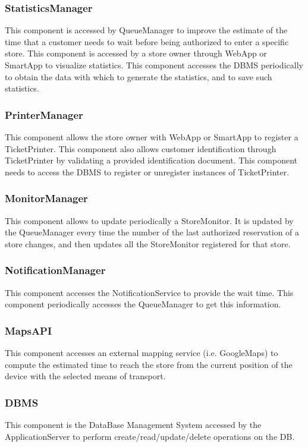 \subsubsection{StatisticsManager}
This component is accessed by QueueManager to improve the estimate of the time that a customer needs to wait before being authorized to enter a specific store. This component is accessed by a store owner through WebApp or SmartApp to visualize statistics. This component accesses the DBMS periodically to obtain the data with which to generate the statistics, and to save such statistics.
\subsubsection{PrinterManager}
This component allows the store owner with WebApp or SmartApp to register a TicketPrinter. This component also allows customer identification through TicketPrinter by validating a provided identification document. This component needs to access the DBMS to register or unregister instances of TicketPrinter.
\subsubsection{MonitorManager}
This component allows to update periodically a StoreMonitor. It is updated by the QueueManager every time the number of the last authorized reservation of a store changes, and then updates all the StoreMonitor registered for that store.
\subsubsection{NotificationManager}
This component accesses the NotificationService to provide the wait time. This component periodically accesses the QueueManager to get this information.
\subsubsection{MapsAPI}
This component accesses an external mapping service (i.e. GoogleMaps) to compute the estimated time to reach the store from the current position of the device with the selected means of transport.
\subsubsection{DBMS}
This component is the DataBase Management System accessed by the ApplicationServer to perform create/read/update/delete operations on the DB.
